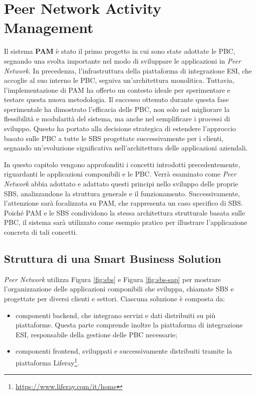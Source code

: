 \chapter{Peer Network Activity Management}
\label{chap:pam}

Il sistema \textbf{\ac{PAM}} è stato il primo progetto in cui sono state
adottate le \ac{PBC}, segnando una svolta importante nel modo di sviluppare le applicazioni in \textit{Peer Network}.
In precedenza, l’infrastruttura della piattaforma di integrazione \ac{ESI}, che accoglie al suo interno
le \ac{PBC}, seguiva un’architettura monolitica. Tuttavia, l’implementazione di \ac{PAM} ha offerto un contesto
ideale per sperimentare e testare questa nuova metodologia. Il successo ottenuto
durante questa fase sperimentale ha dimostrato l’efficacia delle \ac{PBC}, non solo nel migliorare la
flessibilità e modularità del sistema, ma anche nel semplificare i processi di sviluppo. Questo ha
portato alla decisione strategica di estendere l’approccio basato sulle \ac{PBC} a tutte le
\ac{SBS} progettate successivamente per i clienti, segnando un’evoluzione
significativa nell’architettura delle applicazioni aziendali.

In questo capitolo vengono approfonditi i concetti introdotti precedentemente, riguardanti
le applicazioni componibili e le \ac{PBC}. Verrà esaminato come \textit{Peer Network} abbia
adottato e adattato questi principi nello sviluppo delle proprie \ac{SBS}, analizzandone la struttura
generale e il funzionamento. Successivamente, l’attenzione sarà focalizzata su \ac{PAM}, che rappresenta un
caso specifico di \ac{SBS}. Poiché \ac{PAM} e le \ac{SBS} condividono la stessa architettura strutturale basata sulle
\ac{PBC}, il sistema sarà utilizzato come esempio pratico per illustrare l’applicazione concreta di tali
concetti.

\section{Struttura di una Smart Business Solution}
\textit{Peer Network} utilizza Figura \ref{fig:sbs} e Figura \ref{fig:sbs-sap} per mostrare l'organizzazione delle
applicazioni componibili che sviluppa,
chiamate \ac{SBS} e progettate per diversi clienti e settori. Ciascuna
soluzione è composta da:
\begin{itemize}
    \item componenti backend, che integrano servizi e dati distribuiti su più piattaforme. Questa parte
    comprende inoltre la piattaforma di integrazione \ac{ESI}, responsabile della gestione delle \ac{PBC}
    necessarie;
    \item componenti frontend, sviluppati e successivamente distribuiti tramite la piattaforma Liferay\footnote{\url{https://www.liferay.com/it/home}}.
\end{itemize}


